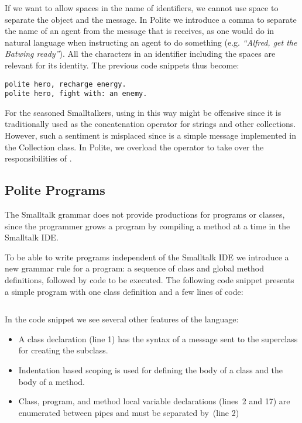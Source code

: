 If we want to allow spaces in the name of identifiers, we cannot use space to separate the object and the message. In Polite we introduce a comma to separate the name of an agent from the message that is receives, as one would do in natural language when instructing an agent to do something (e.g. {\em ``Alfred, get the Batwing ready''}). All the characters in an identifier including the spaces are relevant for its identity. The previous code snippets thus become: 

\begin{verbatim} 
polite hero, recharge energy. 
polite hero, fight with: an enemy.
\end{verbatim}

For the seasoned Smalltalkers, using \comma in this way might be offensive since it is traditionally used as the concatenation operator for strings and other collections. However, such a sentiment is misplaced since \comma is a simple message implemented in the Collection class. In Polite, we overload the \plus operator to take over the responsibilities of \comma.


\subsection{Polite Programs}
The Smalltalk grammar does not provide productions for programs or classes, since the programmer grows a program by compiling a method at a time in the Smalltalk IDE. 

To be able to write programs independent of the Smalltalk IDE we introduce a new grammar rule for a program: a sequence of class and global method definitions, followed by code to be executed. The following code snippet presents a simple program with one class definition and a few lines of code: 
\vspace{0.5em}

\inputminted[bgcolor=lbcolor,linenos]{text}{polite-hero.polite}

\vspace{0.5em}
In the code snippet we see several other features of the language: 

\begin{itemize}

	\item A class declaration (line 1) has the syntax of a message sent to the superclass for creating the subclass. 

	\item Indentation based scoping is used for defining the body of a class and the body of a method. 

	\item Class, program, and method local variable declarations (lines~2 and 17) are enumerated between pipes and must be separated by~\comma (line 2)

\end{itemize}


